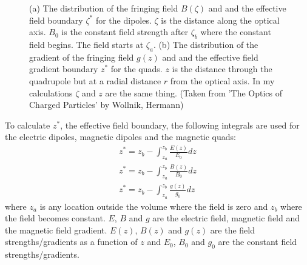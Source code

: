 \documentclass[letter,11pt]{article}
\begin{document}
\begin{figure}
\centering
	\caption{(a) The distribution of the fringing field $B(\zeta)$ and and the effective field boundary $\zeta^{*}$ for the dipoles. $\zeta$ is the distance along the optical axis. $B_{0}$ is the constant field strength after $\zeta_{b}$ where the constant field begins. The field starts at $\zeta_{a}$. (b) The distribution of the gradient of the fringing field $g(z)$ and and the effective field gradient boundary $z^{*}$ for the quads. $z$ is the distance through the quadrupole but at a radial distance $r$ from the optical axis. In my calculations $\zeta$ and $z$ are the same thing. (Taken from 'The Optics of Charged Particles' by Wollnik, Hermann)}
	\label{fig:EFB}
\end{figure}

To calculate $z^{*}$, the effective field boundary, the following integrals are used for the electric dipoles, magnetic dipoles and the magnetic quads:
\begin{align}
z^{*}=z_{b}-\int^{z_{b}}_{z_{a}}\frac{E(z)}{E_{0}}dz\label{eq:integral1}\\
z^{*}=z_{b}-\int^{z_{b}}_{z_{a}}\frac{B(z)}{B_{0}}dz\label{eq:integral2}\\
z^{*}=z_{b}-\int^{z_{b}}_{z_{a}}\frac{g(z)}{g_{0}}dz\label{eq:integral3}
\end{align}
where $z_{a}$ is any location outside the volume where the field is zero and $z_{b}$ where the field becomes constant. $E$, $B$ and $g$ are the electric field, magnetic field and the magnetic field gradient. $E(z)$, $B(z)$ and $g(z)$ are the field strengths/gradients as a function of $z$ and $E_{0}$, $B_{0}$ and $g_{0}$ are the constant field strengths/gradients. 
\end{document}
